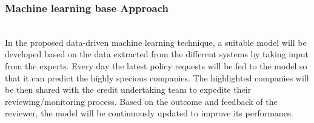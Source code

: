 \subsubsection{Machine learning base Approach}\hspace*{\fill} \\
In the proposed data-driven machine learning technique, a suitable model will be developed based on the data extracted from the different systems by taking input from the experts. Every day the latest policy requests will be fed to the model so that it can predict the highly specious companies. The highlighted companies will be then shared with the credit undertaking team to expedite their reviewing/monitoring process. Based on the outcome and feedback of the reviewer, the model will be continuously updated to improve its performance.



